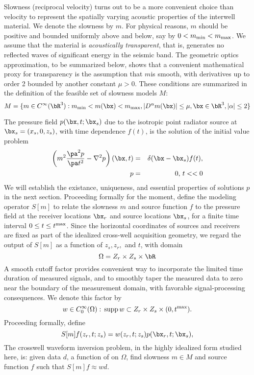 Slowness (reciprocal velocity) turns out to be a more convenient
choice than velocity to represent the spatially varying acoustic
properties of the interwell material. We denote the slowness by $m$.
For physical reasons, $m$ should be positive and bounded uniformly above and 
below, say by $0 < m_{\rm min} < m_{\rm max}$. We assume that the
material is {\em acoustically transparent}, that is, generates no
reflected waves of significant energy in the seismic band. The geometric
optics approximation, to be summarized below, shows that a convenient
mathematical proxy for transparency is the assumption that $m$is
smooth, with derivatives up to
order 2 bounded by another constant $\mu > 0$. These conditions are
summarized in the definition of the feasible set of slowness models $M$:
\begin{equation}
\label{eqn:vfeas}
M=\{m \in C^{\infty}(\bR^3): m_{\rm min} < m(\bx) < m_{\rm max},
|D^{\alpha}m(\bx)| \le \mu,
\bx \in \bR^3, |\alpha| \le 2\}
\end{equation}

The pressure field 
$p(\bx,t;\bx_s)$ due to the isotropic point radiator source at 
$\bx_s=(x_s,0,z_s)$, with time dependence $f(t)$, is the solution of the initial value problem 
\begin{eqnarray}
\left(m^2 \frac{\pa^2 p}{\pa t^2} - \nabla^2 p\right)(\bx,t) &=&
     \delta(\bx-\bx_s) f(t), \nonumber \\
 p&=&0, \, t<<0 \label{eqn:pressure}
\end{eqnarray}
We will establish the existance, uniqueness, and essential properties
of solutions $p$ in the next section. Proceeding formally for the moment,
define the modeling operator $S[m]$ to relate the slowness $m$ and
source function $f$ to the pressure field at the receiver locations
$\bx_r$ and source locations $\bx_s$, for a finite time interval $0
\le t \le t^{\rm max}$. Since the horizontal coordinates of sources and
receivers are fixed as part of the idealized cross-well acquisition
geometry, we regard the output of $S[m]$ as a function of $z_s,z_r,$
and $t$, with domain
\begin{equation}
\label{eqn:omdef}
\Omega = Z_r\times Z_s \times \bR
\end{equation}
 A smooth cutoff factor provides
convenient way to incorporate the limited time duration of measured
signals, and to smoothly taper the measured data to zero near the
boundary of the measurement domain, with favorable signal-processing
consequences. We denote this factor by
\begin{equation}
\label{eqn:wdef}
w \in C_0^{\infty}( \Omega): \,{\rm supp}\,w \subset 
Z_r\times Z_s \times (0,t^{\rm max}).
\end{equation}
Proceeding formally, define
\begin{equation}
\label{eqn:sdef}
S[m]f(z_r,t;z_s) = w(z_r,t;z_s) p(\bx_r,t;\bx_s), 
\end{equation}
The crosswell waveform inversion problem, in the highly idealized form 
studied here, is: given data $d$, a function of on $\Omega$,
find slowness $m \in M$ and source function $f$ such that 
$S[m]f \approx wd$. 


